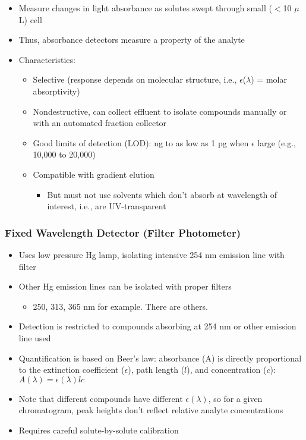 \documentclass[a4paper, 12pt]{article}
\begin{document}
\begin{itemize}
	\item Measure changes in light absorbance as solutes swept through small ($<$10 $\mu{}$L) cell
	\item Thus, absorbance detectors measure a property of the analyte
	\item Characteristics:
	\begin{itemize}
		\item Selective (response depends on molecular structure, i.e., $\epsilon$($\lambda$) = molar absorptivity)
		\item Nondestructive, can collect effluent to isolate compounds manually or with an automated fraction collector
		\item Good limits of detection (LOD):  ng to as low as 1 pg when $\epsilon$ large (e.g., 10,000 to 20,000)
		\item Compatible with gradient elution
		\begin{itemize}
			\item But must not use solvents which don’t absorb at wavelength of interest, i.e., are UV-transparent
		\end{itemize}
	\end{itemize}
\end{itemize}

\subsubsection{Fixed Wavelength Detector (Filter Photometer)}

\begin{itemize}
	\item Uses low pressure Hg lamp, isolating intensive 254 nm emission line with filter
	\item Other Hg emission lines can be isolated with proper filters
	\begin{itemize}
		\item 250, 313, 365 nm for example. There are others.
	\end{itemize}
	\item Detection is restricted to compounds absorbing at 254 nm or other emission line used
	\item Quantification is based on Beer’s law: absorbance (A) is directly proportional to the extinction coefficient ($\epsilon$), path length ($l$), and concentration ($c$):  $A(\lambda) = \epsilon(\lambda)lc$
	\item Note that different compounds have different $\epsilon(\lambda)$, so for a given chromatogram, peak heights don’t reflect relative analyte concentrations
	\item Requires careful solute-by-solute calibration
\end{itemize}
\end{document}
